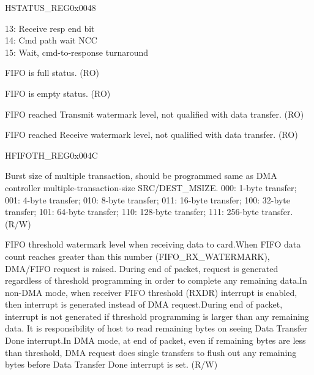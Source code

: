 \begin{register}{H}{STATUS\_REG}{0x0048}
\begin{regdesc}
\begin{reglist}
13: Receive resp end bit\\
14: Cmd path wait NCC\\
15: Wait, cmd-to-response turnaround
\item [FIFO\_FULL]FIFO is full status. (RO)
\item [FIFO\_EMPTY]FIFO is empty status. (RO)
\item [FIFO\_TX\_WATERMARK]FIFO reached Transmit watermark level, not qualified with data transfer. (RO)
\item [FIFO\_RX\_WATERMARK]FIFO reached Receive watermark level, not qualified with data transfer. (RO)
\end{reglist}\end{regdesc}
\end{register}


\begin{register}{H}{FIFOTH\_REG}{0x004C}\label{regdesc:FIFOTHREG}
%
%
%
%
%
%
\regnewline%
\begin{regdesc}\begin{reglist}
\item [DMA\_MULTIPLE\_TRANSACTION\_SIZE]Burst size of multiple transaction, should be programmed same as DMA controller multiple-transaction-size SRC/DEST\_MSIZE. 000: 1-byte transfer; 001: 4-byte transfer; 010: 8-byte transfer; 011: 16-byte transfer; 100: 32-byte transfer; 101: 64-byte transfer; 110: 128-byte transfer; 111: 256-byte transfer. (R/W)
\item [RX\_WMARK]FIFO threshold watermark level when receiving data to card.When FIFO data count reaches greater than this number (FIFO\_RX\_WATERMARK), DMA/FIFO request is raised. During end of packet, request is generated regardless of threshold programming in order to complete any remaining data.In non-DMA mode, when receiver FIFO threshold (RXDR) interrupt is enabled, then interrupt is generated instead of DMA request.During end of packet, interrupt is not generated if threshold programming is larger than any remaining data. It is responsibility of host to read remaining bytes on seeing Data Transfer Done interrupt.In DMA mode, at end of packet, even if remaining bytes are less than threshold, DMA request does single transfers to flush out any remaining bytes before Data Transfer Done interrupt is set. (R/W)

\end{reglist}
\end{regdesc}
\end{register}
